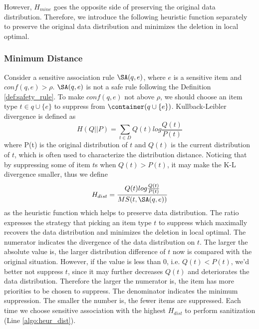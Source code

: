 However, $H_{mine}$ goes the opposite side of preserving the original data
distribution. Therefore, we introduce the following heuristic function
separately to preserve the original data distribution and minimizes the
deletion in local optimal.
\subsubsection{Minimum Distance}
Consider a sensitive association rule $\SA(q,e)$, where $e$ is a
sensitive item and $conf(q,e) > \rho$.
$\SA(q,e)$ is not a safe rule following the
 Definition \ref{def:safety_rule}. To make $conf(q,e)$ not
above $\rho$,
we should choose an item type $t\in q\cup \{e\}$ to suppress from
$\container(q\cup \{e\})$.
Kullback-Leibler divergence is defined as
 \[H(Q||P)=\sum_{t\in
D}Q(t)log\frac{Q(t)}{P(t)}\]
where P(t) is the original distribution of $t$
and $Q(t)$ is the current
 distribution of $t$, which is often used to characterize the distribution
 distance.
Noticing that by suppressing some of item $t$s when $Q(t)>P(t)$, it may make
the K-L divergence smaller, thus we define
\[H_{dist}=\frac{Q(t)log\frac{Q(t)}{P(t)}}{MS(t, \SA(q,e))}\]
 as the heuristic
function which helps to preserve data distribution. The ratio expresses the
strategy that picking an item type $t$ to suppress which maximally recovers
the data distribution and minimizes the deletion in local optimal.
 The numerator indicates the divergence of the data distribution on $t$.
 The larger the absolute value is,
the larger distribution difference of $t$ now is compared with the original
situation. However, if the value is less than 0, i.e. $Q(t)<P(t)$, we'd
better not suppress $t$, since it may further decreases $Q(t)$ and
deteriorates the data distribution. Therefore the larger the numerator is,
the item has more priorities to be chosen to suppress.
The denominator indicates the minimum suppression. The smaller the number is,
the fewer items are suppressed. Each time we choose sensitive association
with the highest $H_{dist}$ to perform sanitization (Line
\ref{algo:heur_dist}).



